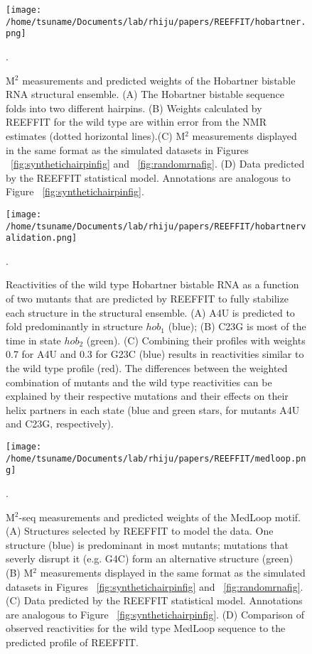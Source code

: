 \documentclass[12pt]{article}
\begin{document}
\begin{figure}[here]
\texttt{[image: /home/tsuname/Documents/lab/rhiju/papers/REEFFIT/hobartner.png]}
\caption{M$^2$ measurements and predicted weights of the Hobartner bistable RNA structural ensemble. (A) The Hobartner bistable sequence folds into two different hairpins. (B) Weights calculated by REEFFIT for the wild type are within error from the NMR estimates (dotted horizontal lines).(C) M$^2$ measurements displayed in the same format as the simulated datasets in Figures ~\ref{fig:synthetichairpinfig} and ~\ref{fig:randomrnafig}. (D) Data predicted by the REEFFIT statistical model. Annotations are analogous to Figure ~\ref{fig:synthetichairpinfig}.}.
\label{fig:hobartnerfig}
\end{figure}

\begin{figure}[here]
\texttt{[image: /home/tsuname/Documents/lab/rhiju/papers/REEFFIT/hobartnervalidation.png]}
\caption{Reactivities of the wild type Hobartner bistable RNA as a function of two mutants that are predicted by REEFFIT to fully stabilize each structure in the structural ensemble. (A) A4U is predicted to fold predominantly in structure $hob_1$ (blue); (B) C23G is most of the time in state $hob_2$ (green). (C) Combining their profiles with weights 0.7 for A4U and 0.3 for G23C (blue) results in reactivities similar to the wild type profile (red). The differences between the weighted combination of mutants and the wild type reactivities can be explained by their respective mutations and their effects on their helix partners in each state (blue and green stars, for mutants A4U and C23G, respectively).}.
\label{fig:hobartnervalidationfig}
\end{figure}




\begin{figure}[here]
\texttt{[image: /home/tsuname/Documents/lab/rhiju/papers/REEFFIT/medloop.png]}
\caption{M$^2$-seq measurements and predicted weights of the MedLoop motif. (A) Structures selected by REEFFIT to model the data. One structure (blue) is predominant in most mutants; mutations that severly disrupt it (e.g. G4C) form an alternative structure (green)  (B) M$^2$ measurements displayed in the same format as the simulated datasets in Figures ~\ref{fig:synthetichairpinfig} and ~\ref{fig:randomrnafig}. (C) Data predicted by the REEFFIT statistical model. Annotations are analogous to Figure ~\ref{fig:synthetichairpinfig}. (D) Comparison of observed reactivities for the wild type MedLoop sequence to the predicted profile of REEFFIT.}.
\label{fig:medloopfig}
\end{figure}
\end{document}
